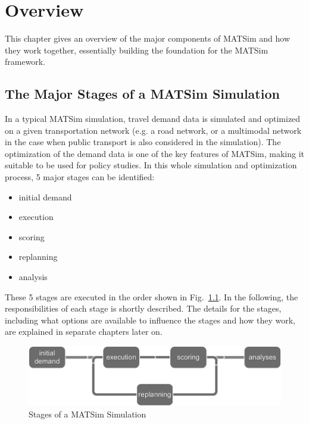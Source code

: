 \chapter{Overview}
\label{sec:Overview}

 
\bigskip

\begin{chapter-intro}
This chapter gives an overview of the major components of MATSim and how they
work together, essentially building the foundation for the MATSim framework.
\end{chapter-intro}

\section{The Major Stages of a MATSim Simulation}

In a typical MATSim simulation, travel demand data is simulated and optimized on
a given transportation network (e.g. a road network, or a multimodal network in
the case when public transport is also considered in the simulation).
The optimization of the demand data is one of the key features of MATSim, making
it suitable to be used for policy studies. In this whole simulation and
optimization process, 5 major stages can be identified:
\begin{itemize}\styleItemize
	\item initial demand
	\item execution
	\item scoring
	\item replanning
	\item analysis
\end{itemize}

These 5 stages are executed in the order shown in
Fig.~\ref{fig:overview:controllerFlow}.
In the following, the responsibilities of each stage is shortly described. The
details for the stages, including what options are available to influence the
stages and how they work, are explained in separate chapters later on.


\begin{figure}[htp]
\begin{center}
  \includegraphics[width=.8\textwidth]{figures/overview/controllerFlow.png}
  \caption{Stages of a MATSim Simulation}
  \label{fig:overview:controllerFlow}
\end{center}
\end{figure}

